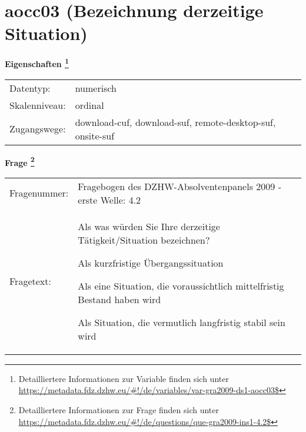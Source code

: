 
    \setcounter{footnote}{0}

    \vspace*{-1.8cm}
	\section{aocc03 (Bezeichnung derzeitige Situation)}
	\label{section:aocc03}



    \vspace*{0.5cm}
    \noindent\textbf{Eigenschaften
	\footnote{Detailliertere Informationen zur Variable finden sich unter
		\url{https://metadata.fdz.dzhw.eu/\#!/de/variables/var-gra2009-ds1-aocc03$}}}\\
	\begin{tabularx}{\hsize}{@{}lX}
	Datentyp: & numerisch \\
	Skalenniveau: & ordinal \\
	Zugangswege: &
	  download-cuf, 
	  download-suf, 
	  remote-desktop-suf, 
	  onsite-suf
 \\
    \end{tabularx}



				\vspace*{0.5cm}
                \noindent\textbf{Frage
	                \footnote{Detailliertere Informationen zur Frage finden sich unter
		              \url{https://metadata.fdz.dzhw.eu/\#!/de/questions/que-gra2009-ins1-4.2$}}}\\
				\begin{tabularx}{\hsize}{@{}lX}
					Fragenummer: &
					  Fragebogen des DZHW-Absolventenpanels 2009 - erste Welle:
					  4.2
 \\
					Fragetext: & Als was würden Sie Ihre derzeitige Tätigkeit/Situation bezeichnen?\par  Als kurzfristige Übergangssituation\par  Als eine Situation, die voraussichtlich mittelfristig Bestand haben wird\par  Als Situation, die vermutlich langfristig stabil sein wird \\
				\end{tabularx}





